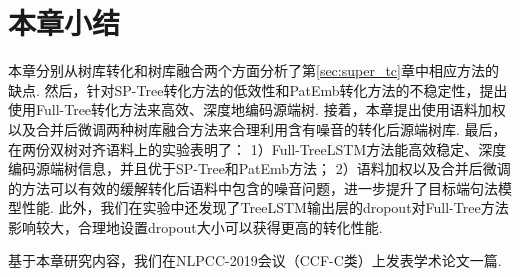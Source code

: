 \section{本章小结}
本章分别从树库转化和树库融合两个方面分析了第\ref{sec:super_tc}章中相应方法的缺点. 然后，针对SP-Tree转化方法的低效性和PatEmb转化方法的不稳定性，提出使用Full-Tree转化方法来高效、深度地编码源端树. 接着，本章提出使用语料加权以及合并后微调两种树库融合方法来合理利用含有噪音的转化后源端树库. 最后，在两份双树对齐语料上的实验表明了：
1）Full-TreeLSTM方法能高效稳定、深度编码源端树信息，并且优于SP-Tree和PatEmb方法；
2）语料加权以及合并后微调的方法可以有效的缓解转化后语料中包含的噪音问题，进一步提升了目标端句法模型性能.
此外，我们在实验中还发现了TreeLSTM输出层的dropout对Full-Tree方法影响较大，合理地设置dropout大小可以获得更高的转化性能.

基于本章研究内容，我们在NLPCC-2019会议（CCF-C类）上发表学术论文一篇.



